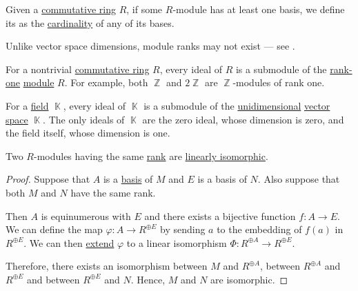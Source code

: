 \begin{definition}\label{def:module_rank}\mimprovised
  Given a \hyperref[def:ring/commutative]{commutative ring} \( R \), if some \( R \)-module has at least one basis, we define its  as the \hyperref[thm:cardinality_existence]{cardinality} of any of its bases.
\end{definition}
\begin{comments}
  \item Unlike vector space dimensions, module ranks may not exist --- see .
\end{comments}

\begin{example}\label{ex:field_submodules}
  For a nontrivial \hyperref[def:ring/commutative]{commutative ring} \( R \), every ideal of \( R \) is a submodule of the \hyperref[def:module_rank]{rank-one} \hyperref[def:module]{module} \( R \). For example, both \( \BbbZ \) and \( 2\BbbZ \) are \( \BbbZ \)-modules of rank one.

  For a \hyperref[def:field]{field} \( \BbbK \), every ideal of \( \BbbK \) is a submodule of the \hyperref[thm:vector_space_dimension]{unidimensional} \hyperref[def:vector_space]{vector space} \( \BbbK \). The only ideals of \( \BbbK \) are the zero ideal, whose dimension is zero, and the field itself, whose dimension is one.
\end{example}

\begin{proposition}\label{thm:modules_with_same_rank_are_isomorphic}
  Two \( R \)-modules having the same \hyperref[def:module_rank]{rank} are \hyperref[def:linear_function]{linearly isomorphic}.
\end{proposition}
\begin{proof}
  Suppose that \( A \) is a \hyperref[def:hamel_basis]{basis} of \( M \) and \( E \) is a basis of \( N \). Also suppose that both \( M \) and \( N \) have the same rank.

  Then \( A \) is equinumerous with \( E \) and there exists a bijective function \( f: A \to E \). We can define the map \( \varphi: A \to R^{\oplus E} \) by sending \( a \) to the embedding of \( f(a) \) in \( R^{\oplus E} \). We can then \hyperref[thm:free_semimodule_universal_property]{extend} \( \varphi \) to a linear isomorphism \( \Phi: R^{\oplus A} \to R^{\oplus E} \).

  Therefore, there exists an isomorphism between \( M \) and \( R^{\oplus A} \), between \( R^{\oplus A} \) and \( R^{\oplus E} \) and between \( R^{\oplus E} \) and \( N \). Hence, \( M \) and \( N \) are isomorphic.
\end{proof}


